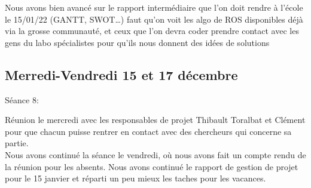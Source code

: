 \documentclass[11pt]{article}
\begin{document}
Nous avons bien avancé sur le rapport intermédiaire que l’on doit rendre à l’école le 15/01/22 (GANTT, SWOT…)
faut qu’on voit les algo de ROS disponibles déjà via la grosse communauté, et ceux que l’on devra coder
prendre contact avec les gens du labo spécialistes pour qu’ils nous donnent des idées de solutions


\subsection{Merredi-Vendredi 15 et 17 décembre}

Séance 8:

Réunion le mercredi avec les responsables de projet Thibault Toralbat et Clément pour que chacun puisse rentrer en contact avec des chercheurs qui concerne sa partie.\\
Nous avons continué la séance le vendredi, où nous avons fait un compte rendu de la réunion pour les absents. Nous avons continué le rapport de gestion de projet pour le 15 janvier et réparti un peu mieux les taches pour les vacances.
\end{document}
